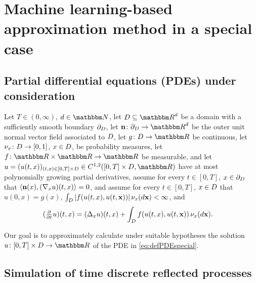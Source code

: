 \section{Machine learning-based approximation method in a special case}
\label{sec:derivation_spec}
%
\subsection{Partial differential equations (PDEs) under consideration}

Let
$ T \in (0,\infty) $,
$ d \in \N $,
let
$\D \subseteq \R^d$
be a domain with a sufficiently smooth boundary
$\partial_D$,
let $ {\textbf n} \colon \partial_\D \to \R^d $ be the outer unit normal vector field associated to $D$,
let
$
g\colon \D \to \R
$
be continuous,
let
$\nu_x \colon D \to [0,1]$,
$x \in D$,
be probability measures,
let
$
f \colon \R \times \R \to \R
$
be measurable,
and let
$
u=
(u(t,x))_{(t,x)\in [0,T]\times\D}\in C^{1,2}([0,T]\times\D,\R)
$
have at most polynomially growing partial derivatives, 
assume for every
$t\in [0,T]$,
$x\in \partial_D$
that
$ \left<{\textbf n}(x) ,(\nabla_x u)(t,x)\right> = 0$,
and assume for every
$t\in [0,T]$,
$x\in D$
that
$u(0,x)=g(x)$,
$\int_D |f(u(t,x),u(t,{\textbf x})) | \, \nu_x(d{\textbf x}) < \infty$,
and
\begin{equation}
\begin{split}
\label{eq:defPDEspecial}
(\tfrac{\partial}{\partial t}u)(t,x)
&=  (\Delta_x u)(t,x)
+
\int_{D} f(u(t,x),u(t,{\textbf x})) \, \nu_x(d{\textbf x}).
\end{split}
\end{equation}

Our goal is to approximately calculate under suitable hypotheses the solution $u\colon [0,T]\times \D \to \R$ of the PDE in \eqref{eq:defPDEspecial}.
%
%

\subsection{Simulation of time discrete reflected processes}

